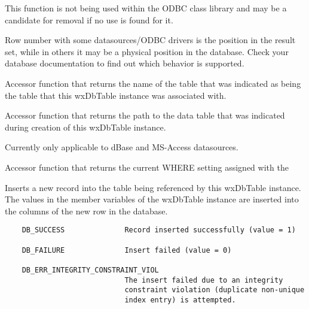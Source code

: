 This function is not being used within the ODBC class library and may be a 
candidate for removal if no use is found for it.

Row number with some datasources/ODBC drivers is the position in the result set, 
while in others it may be a physical position in the database.  Check your 
database documentation to find out which behavior is supported.


\label{wxdbtablegettablename}


Accessor function that returns the name of the table that was indicated 
as being the table that this wxDbTable instance was associated with.


\label{wxdbtablegettablepath}


Accessor function that returns the path to the data table that was indicated 
during creation of this wxDbTable instance.


Currently only applicable to dBase and MS-Access datasources.


\label{wxdbtablegetwhereclause}


Accessor function that returns the current WHERE setting assigned with the 




\label{wxdbtableinsert}


Inserts a new record into the table being referenced by this wxDbTable 
instance.  The values in the member variables of the wxDbTable instance are 
inserted into the columns of the new row in the database.
 

\begin{verbatim}
    DB_SUCCESS              Record inserted successfully (value = 1)

    DB_FAILURE              Insert failed (value = 0)

    DB_ERR_INTEGRITY_CONSTRAINT_VIOL    
                            The insert failed due to an integrity
                            constraint violation (duplicate non-unique
                            index entry) is attempted.
\end{verbatim}

